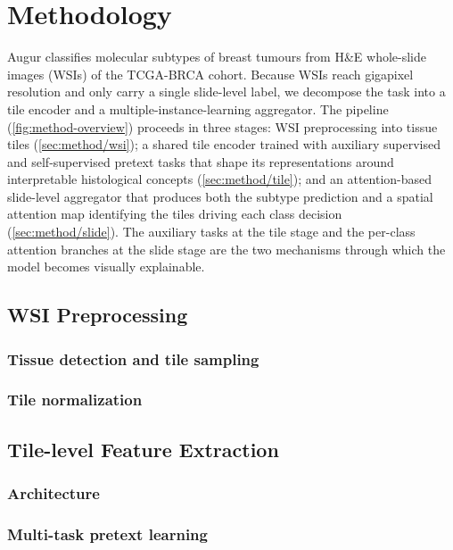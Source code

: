 \section{Methodology}\label{sec:method}
Augur classifies molecular subtypes of breast tumours from H\&E whole-slide images (WSIs) of the TCGA-BRCA cohort. Because WSIs reach gigapixel resolution and only carry a single slide-level label, we decompose the task into a tile encoder and a multiple-instance-learning aggregator. The pipeline (\autoref{fig:method-overview}) proceeds in three stages: WSI preprocessing into tissue tiles (\autoref{sec:method/wsi}); a shared tile encoder trained with auxiliary supervised and self-supervised pretext tasks that shape its representations around interpretable histological concepts (\autoref{sec:method/tile}); and an attention-based slide-level aggregator that produces both the subtype prediction and a spatial attention map identifying the tiles driving each class decision (\autoref{sec:method/slide}). The auxiliary tasks at the tile stage and the per-class attention branches at the slide stage are the two mechanisms through which the model becomes visually explainable.

    \subsection{WSI Preprocessing}\label{sec:method/wsi}

        \subsubsection{Tissue detection and tile sampling} 

        \subsubsection{Tile normalization}

    \subsection{Tile-level Feature Extraction}\label{sec:method/tile}

        \subsubsection{Architecture}
    
        \subsubsection{Multi-task pretext learning}
